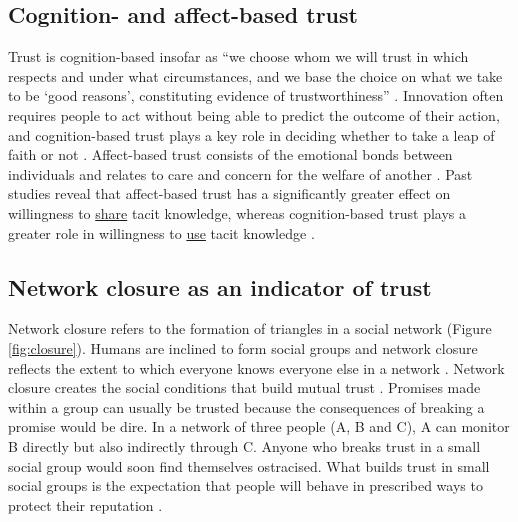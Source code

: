 \subsection{Cognition- and affect\hyp{}based trust}

Trust is cognition-based insofar as \enquote{we choose whom we will trust in which respects and under what circumstances, and we base the choice on what we take to be \enquote{good reasons}, constituting evidence of trustworthiness} \citep[][pg. 970]{lewis1985trust}. Innovation often requires people to act without being able to predict the outcome of their action, and cognition\hyp{}based trust plays a key role in deciding whether to take a leap of faith or not \citep{mcevily2011measuring}. Affect-based trust consists of the emotional bonds between individuals and relates to care and concern for the welfare of another \citep{mcallister1995affect}. Past studies reveal that affect\hyp{}based trust has a significantly greater effect on willingness to \underline{share} tacit knowledge, whereas cognition-based trust plays a greater role in willingness to \underline{use} tacit knowledge \citep{levin2004strength,holste2010trust,ding2015research}. 

\subsection{Network closure as an indicator of trust}

Network closure refers to the formation of triangles in a social network (Figure \ref{fig:closure}). Humans are inclined to form social groups and network closure reflects the extent to which everyone knows everyone else in a network \citep{coleman1990foundations}. Network closure creates the social conditions that build mutual trust \citep{ahuja2000collaboration, fulmer2013trust}. Promises made within a group can usually be trusted because the consequences of breaking a promise would be dire. In a network of three people (A, B and C), A can monitor B directly but also indirectly through C. Anyone who breaks trust in a small social group would soon find themselves ostracised. What builds trust in small social groups is the expectation that people will behave in prescribed ways to protect their reputation \citep{coleman1990foundations, burt2005brokerage}.

